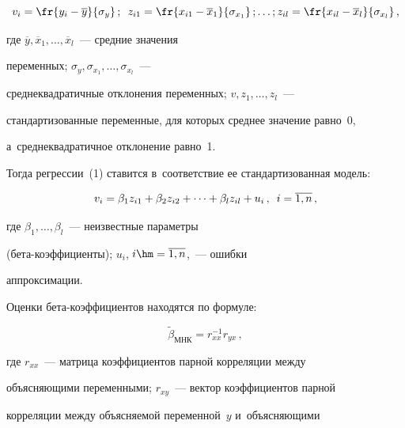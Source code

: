   $$v_i=\fr{y_i-\overline{y}}{\sigma_y}\,;\enskip z_{i1}=\fr{x_{i1}-


\overline{x}_1}{\sigma_{x_1}}\,;\ldots ; z_{il}=\fr{x_{il}-


\overline{x}_l}{\sigma_{x_l}}\,,


  $$


где $\overline{y}, \overline{x}_1, \ldots,  \overline{x}_l$~--- средние значения 


переменных; $\sigma_y, \sigma_{x_1}, \ldots, \sigma_{x_l}$~--- 


сред\-не\-квад\-ра\-тич\-ные отклонения переменных; $v, z_1, \ldots , z_l$~--- 


стандартизованные переменные, для которых среднее значение равно~0, 


а~среднеквадратичное отклонение равно~1.


  


  Тогда регрессии~(1) ставится в~соответствие ее стандартизованная модель:


  \begin{equation}


  v_i=\beta_1 z_{i1}+\beta_2 z_{i2} +\cdots + \beta_l z_{il}+u_i\,,\enskip


  i=\overline{1,n}\,,


  \label{e2-baz}


  \end{equation}


где $\beta_1, \ldots , \beta_l$~--- неизвестные параметры  


(бе\-та-ко\-эф\-фи\-ци\-ен\-ты); $u_i$, $i\hm=\overline{1,n}$,~--- ошиб\-ки 


аппроксимации.


  


  Оценки бета-коэффициентов находятся по формуле:


  \begin{equation*}


  \tilde{\beta}_{\mathrm{МНК}}=r^{-1}_{xx} r_{yx}\,,




  \end{equation*}


где $r_{xx}$~--- матрица коэффициентов парной корреляции между 


объясняющими переменными; $r_{xy}$~--- вектор коэффициентов парной 


корреляции между объясняемой переменной~$y$ и~объясняющими 


